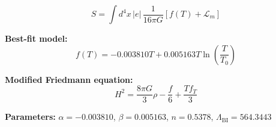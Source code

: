 
\begin{equation}
  S = \int d^4x \, |e| \, \frac{1}{16\pi G} \left[ f(T) + \mathcal{L}_m \right]
\end{equation}

\textbf{Best-fit model:}
\begin{equation}
  f(T) = -0.003810 T + 0.005163 T \ln\!\left(\frac{T}{T_0}\right)
\end{equation}

\textbf{Modified Friedmann equation:}
\begin{equation}
  H^2 = \frac{8\pi G}{3} \rho - \frac{f}{6} + \frac{T f_T}{3}
\end{equation}

\textbf{Parameters:}
$\alpha = -0.003810$, \quad
$\beta = 0.005163$, \quad
$n = 0.5378$, \quad
$\Lambda_{\text{BI}} = 564.3443$